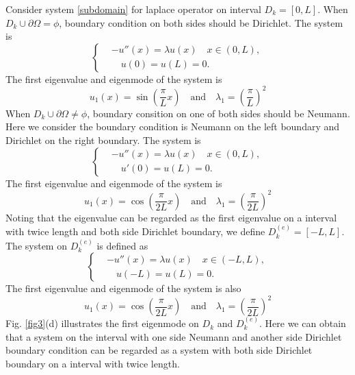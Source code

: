 \documentclass[a4paper,11pt]{article}
\begin{document}
Consider system \eqref{subdomain} for laplace operator on interval $D_k = [0, L]$. When $D_k \cup \partial \Omega = \phi$, boundary condition on both sides should be Dirichlet. The system is
\begin{equation*}
\left\{
\begin{split}
& - u''(x) = \lambda u(x) \quad x \in (0, L), \\
& \quad u(0) = u(L) = 0.
\end{split}
\right.
\end{equation*}
The first eigenvalue and eigenmode of the system is
\begin{equation*}
u_1(x) = \sin(\frac{\pi}{L} x) \quad \text{and} \quad \lambda_1 = (\frac{\pi}{L})^2
\end{equation*}
When $D_k \cup \partial \Omega \neq \phi$, boundary consition on one of both sides should be Neumann. Here we consider the boundary condition is Neumann on the left boundary and Dirichlet on the right boundary. The system is
\begin{equation*}
\left\{
\begin{split}
& - u''(x) = \lambda u(x) \quad x \in (0, L), \\
& \quad u'(0) = u(L) = 0.
\end{split}
\right.
\end{equation*}
The first eigenvalue and eigenmode of the system is
\begin{equation*}
u_1(x) = \cos(\frac{\pi}{2 L} x) \quad \text{and} \quad \lambda_1 = (\frac{\pi}{2 L})^2
\end{equation*}
Noting that the eigenvalue can be regarded as the first eigenvalue on a interval with twice length and both side Dirichlet boundary, we define $D_k^{(e)} = [-L, L]$. The system on $D_k^{(e)}$ is defined as
\begin{equation*}
\left\{
\begin{split}
& - u''(x) = \lambda u(x) \quad x \in (-L, L), \\
& \quad u(-L) = u(L) = 0.
\end{split}
\right.
\end{equation*}
The first eigenvalue and eigenmode of the system is also
\begin{equation*}
u_1(x) = \cos(\frac{\pi}{2 L} x) \quad \text{and} \quad \lambda_1 = (\frac{\pi}{2 L})^2
\end{equation*}
Fig. \ref{fig3}(d) illustrates the first eigenmode on $D_k$ and $D_k^{(e)}$. Here we can obtain that a system on the interval with one side Neumann and another side Dirichlet boundary condition can be regarded as a system with both side Dirichlet boundary on a interval with twice length.
\end{document}

